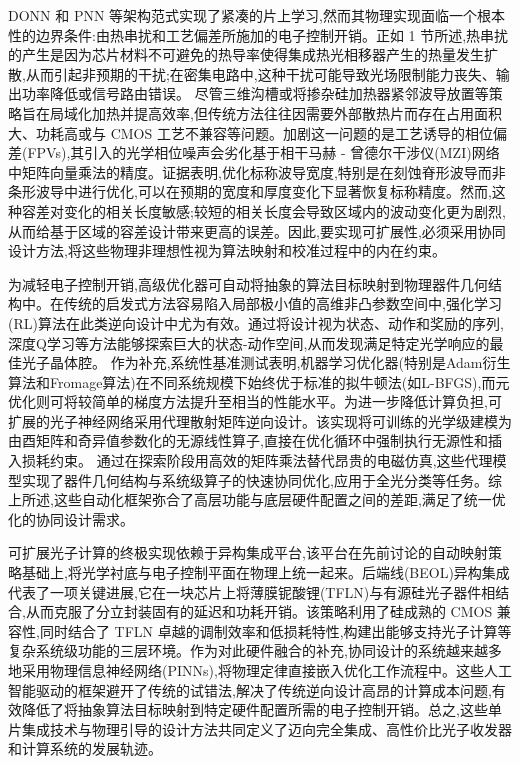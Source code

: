 \documentclass[11pt]{article}
\begin{document}
DONN 和 PNN 等架构范式实现了紧凑的片上学习,然而其物理实现面临一个根本性的边界条件:由热串扰和工艺偏差所施加的电子控制开销。正如 1 节所述,热串扰的产生是因为芯片材料不可避免的热导率使得集成热光相移器产生的热量发生扩散,从而引起非预期的干扰;在密集电路中,这种干扰可能导致光场限制能力丧失、输出功率降低或信号路由错误。\citep{doi_10_1109_access_2020_3013116_8fec1fb2} 尽管三维沟槽或将掺杂硅加热器紧邻波导放置等策略旨在局域化加热并提高效率,但传统方法往往因需要外部散热片而存在占用面积大、功耗高或与 CMOS 工艺不兼容等问题。加剧这一问题的是工艺诱导的相位偏差(FPVs),其引入的光学相位噪声会劣化基于相干马赫 - 曾德尔干涉仪(MZI)网络中矩阵向量乘法的精度。证据表明,优化标称波导宽度,特别是在刻蚀脊形波导而非条形波导中进行优化,可以在预期的宽度和厚度变化下显著恢复标称精度。然而,这种容差对变化的相关长度敏感;较短的相关长度会导致区域内的波动变化更为剧烈,从而给基于区域的容差设计带来更高的误差。因此,要实现可扩展性,必须采用协同设计方法,将这些物理非理想性视为算法映射和校准过程中的内在约束。\citep{doi_10_1109_access_2020_3013116_8fec1fb2} \citep{doi_10_1109_tnano_2022_3223915_d4da3e6b}

为减轻电子控制开销,高级优化器可自动将抽象的算法目标映射到物理器件几何结构中。在传统的启发式方法容易陷入局部极小值的高维非凸参数空间中,强化学习(RL)算法在此类逆向设计中尤为有效。通过将设计视为状态、动作和奖励的序列,深度Q学习等方法能够探索巨大的状态-动作空间,从而发现满足特定光学响应的最佳光子晶体腔。\citep{doi_10_1515_nanoph_2022_0692_4b166807} 作为补充,系统性基准测试表明,机器学习优化器(特别是Adam衍生算法和Fromage算法)在不同系统规模下始终优于标准的拟牛顿法(如L-BFGS),而元优化则可将较简单的梯度方法提升至相当的性能水平。为进一步降低计算负担,可扩展的光子神经网络采用代理散射矩阵逆向设计。该实现将可训练的光学级建模为由酉矩阵和奇异值参数化的无源线性算子,直接在优化循环中强制执行无源性和插入损耗约束。\citep{s2_753a5d83a96e0194da93bcb6f20fa0bd356e37fa_c11e3796} 通过在探索阶段用高效的矩阵乘法替代昂贵的电磁仿真,这些代理模型实现了器件几何结构与系统级算子的快速协同优化,应用于全光分类等任务。综上所述,这些自动化框架弥合了高层功能与底层硬件配置之间的差距,满足了统一优化的协同设计需求。\citep{doi_10_1515_nanoph_2022_0692_4b166807} \citep{doi_10_1063_5_0238444_48bf2cbe} \citep{s2_753a5d83a96e0194da93bcb6f20fa0bd356e37fa_c11e3796}

可扩展光子计算的终极实现依赖于异构集成平台,该平台在先前讨论的自动映射策略基础上,将光学衬底与电子控制平面在物理上统一起来。后端线(BEOL)异构集成代表了一项关键进展,它在一块芯片上将薄膜铌酸锂(TFLN)与有源硅光子器件相结合,从而克服了分立封装固有的延迟和功耗开销。该策略利用了硅成熟的 CMOS 兼容性,同时结合了 TFLN 卓越的调制效率和低损耗特性,构建出能够支持光子计算等复杂系统级功能的三层环境。作为对此硬件融合的补充,协同设计的系统越来越多地采用物理信息神经网络(PINNs),将物理定律直接嵌入优化工作流程中。这些人工智能驱动的框架避开了传统的试错法,解决了传统逆向设计高昂的计算成本问题,有效降低了将抽象算法目标映射到特定硬件配置所需的电子控制开销。总之,这些单片集成技术与物理引导的设计方法共同定义了迈向完全集成、高性价比光子收发器和计算系统的发展轨迹。\citep{s2_9b444e84d20ae6e3d62d2d4df30268b5a53baad2_40af2cc9} \citep{s2_037e66f37189104d61c0d000de0cee202b7eec9e_d15b8018}
\end{document}
